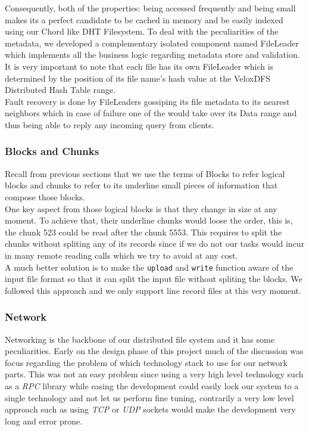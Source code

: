 Consequently, both of the properties: being accessed frequently and being small makes its a perfect candidate to be cached in memory and be easily indexed using our Chord like DHT Filesystem. To deal with the peculiarities of the metadata, we developed a complementary isolated component named FileLeader which implements all the business logic regarding metadata store and validation. It is very important to note that each file has its own FileLeader which is determined by the position of its file name's hash value at the VeloxDFS Distributed Hash Table range. \\

Fault recovery is done by FileLeaders gossiping its file metadata to its nearest neighbors which in case of failure one of the would take over its Data range and thus being able to reply any incoming query from clients. 

\subsubsection{Blocks and Chunks}
Recall from previous sections that we use the terms of Blocks to refer logical blocks and chunks to refer to its underline small pieces of information that compose those blocks. \\
One key aspect from those logical blocks is that they change in size at any moment. To achieve that, 
their underline chunks would loose the order, this is, the chunk 523 could be read after the chunk 5553. This requires to split the chunks without spliting any of its records since if we do not our tasks would incur in many remote reading calls which we try to avoid at any cost. \\
A much better solution is to make the \texttt{upload} and \texttt{write} function aware of the input file format so that it can split the input file without spliting the blocks. We followed this approach and we only support line record files at this very moment.


\subsubsection{Network}
Networking is the backbone of our distributed file system and it has some peculiarities. Early on the
design phase of this project much of the discussion was focus regarding the problem of which technology stack to use for our network parts. This was not an easy problem since using a very high level technology such as a \textit{RPC} library while easing the development could easily lock our system to a single technology and not let us perform fine tuning, contrarily a very low level approach such as using \textit{TCP} or \textit{UDP} sockets would make the development very long and error prone. \\

